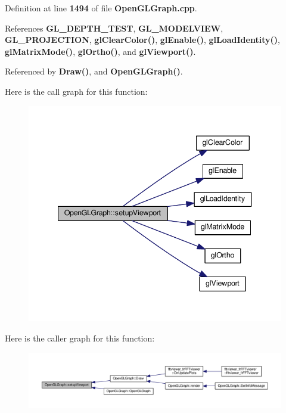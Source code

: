 Definition at line {\bf 1494} of file {\bf Open\+G\+L\+Graph.\+cpp}.



References {\bf G\+L\+\_\+\+D\+E\+P\+T\+H\+\_\+\+T\+E\+ST}, {\bf G\+L\+\_\+\+M\+O\+D\+E\+L\+V\+I\+EW}, {\bf G\+L\+\_\+\+P\+R\+O\+J\+E\+C\+T\+I\+ON}, {\bf gl\+Clear\+Color()}, {\bf gl\+Enable()}, {\bf gl\+Load\+Identity()}, {\bf gl\+Matrix\+Mode()}, {\bf gl\+Ortho()}, and {\bf gl\+Viewport()}.



Referenced by {\bf Draw()}, and {\bf Open\+G\+L\+Graph()}.



Here is the call graph for this function\+:
\nopagebreak
\begin{figure}[H]
\begin{center}
\leavevmode
\includegraphics[width=340pt]{d9/d73/classOpenGLGraph_abc18a2f8685491e687b223a87833bc85_cgraph}
\end{center}
\end{figure}




Here is the caller graph for this function\+:
\nopagebreak
\begin{figure}[H]
\begin{center}
\leavevmode
\includegraphics[width=350pt]{d9/d73/classOpenGLGraph_abc18a2f8685491e687b223a87833bc85_icgraph}
\end{center}
\end{figure}


